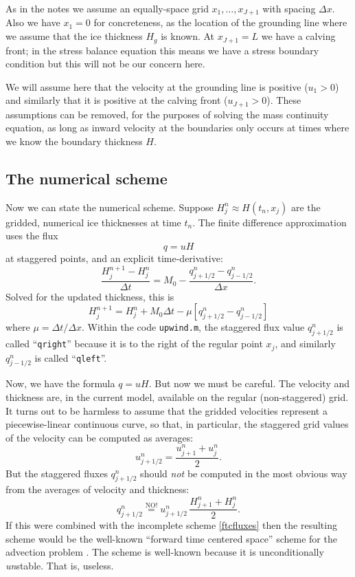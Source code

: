 \documentclass[titlepage,a4paper,final,12pt]{scrartcl}
\begin{document}
As in the notes we assume an equally-space grid $x_1,\dots,x_{J+1}$ with spacing $\Delta x$.  Also we have $x_1=0$ for concreteness, as the location of the grounding line where we assume that the ice thickness $H_g$ is known.  At $x_{J+1} = L$ we have a calving front; in the stress balance equation this means we have a stress boundary condition but this will not be our concern here.

We will assume here that the velocity at the grounding line is positive ($u_1 > 0$) and similarly that it is positive at the calving front ($u_{J+1} > 0$).  These assumptions can be removed, for the purposes of solving the mass continuity equation, as long as inward velocity at the boundaries only occurs at times where we know the boundary thickness $H$.

\subsection*{The numerical scheme}   Now we can state the numerical scheme.  Suppose $H_j^n \approx H(t_n,x_j)$ are the gridded, numerical ice thicknesses at time $t_n$.  The finite difference approximation uses the flux
	$$q = u H$$
at staggered points, and an explicit time-derivative:
	$$\frac{H_j^{n+1} - H_j^n}{\Delta t} = M_0 - \frac{q_{j+1/2}^n - q_{j-1/2}^n}{\Delta x}.$$
Solved for the updated thickness, this is
\begin{equation}
H_j^{n+1} = H_j^n + M_0 \Delta t - \mu \left[q_{j+1/2}^n - q_{j-1/2}^n\right]  \label{ftcfluxes}
\end{equation}
where $\mu = \Delta t / \Delta x$.  Within the code \texttt{upwind.m}, the staggered flux value $q_{j+1/2}^n$ is called ``\texttt{qright}'' because it is to the right of the regular point $x_j$, and similarly $q_{j-1/2}^n$ is called ``\texttt{qleft}''.

Now, we have the formula $q = u H$.  But now we must be careful.  The velocity and thickness are, in the current model, available on the regular (non-staggered) grid.  It turns out to be harmless to assume that the gridded velocities represent a piecewise-linear continuous curve, so that, in particular, the staggered grid values of the velocity can be computed as averages:
	$$u_{j+1/2}^n = \frac{u_{j+1}^n + u_j^n}{2}.$$
But the staggered fluxes $q_{j+1/2}^n$ should \emph{not} be computed in the most obvious way from the averages of velocity and thickness:
	$$q_{j+1/2}^n \stackrel{\text{NO!}}{=} u_{j+1/2}^n\,\frac{H_{j+1}^n + H_j^n}{2}.$$
If this were combined with the incomplete scheme \eqref{ftcfluxes} then the resulting scheme would be the well-known ``forward time centered space'' scheme for the advection problem \cite{MortonMayers}.  The scheme is well-known because it is unconditionally \emph{un}stable.  That is, useless.
\end{document}
